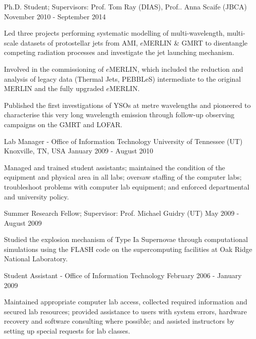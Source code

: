 \begin{cventries}
  \cventry
    {Ph.D. Student; Supervisors: Prof. Tom Ray (DIAS), Prof.. Anna Scaife (JBCA)}
    {}
    {}
    {November 2010 - September 2014}
    {
      \begin{cvitems}
        \item {Led three projects performing systematic modelling of multi-wavelength, multi-scale datasets of protostellar jets from AMI, $e$MERLIN \& GMRT to disentangle competing radiation processes and investigate the jet launching mechanism.}
        \item {Involved in the commissioning of $e$MERLIN, which included the reduction and analysis of legacy data (Thermal Jets, PEBBLeS) intermediate to the original MERLIN and the fully upgraded $e$MERLIN.}
        \item {Published the first investigations of YSOs at metre wavelengths and pioneered to characterise this very long wavelength emission through follow-up observing campaigns on the GMRT and LOFAR.}
      \end{cvitems} 
    }\vspace{-6pt}

\cventry
    {Lab Manager - Office of Information Technology}
    {University of Tennessee (UT)}
    {Knoxville, TN, USA}
    {January 2009 - August 2010}
    {
      \begin{cvitems}
        \item {Managed and trained student assistants; maintained the condition of the equipment and physical area in all labs; oversaw staffing of the computer labs; troubleshoot problems with computer lab equipment; and enforced departmental and university policy.}
      \end{cvitems}
    }\vspace{-15pt}

\cventry
    {Summer Research Fellow; Supervisor: Prof. Michael Guidry (UT)}
    {}
    {}
    {May 2009 - August 2009}
    {
      \begin{cvitems}
        \item {Studied the explosion mechanism of Type Ia Supernovae through computational simulations using the FLASH code on the supercomputing facilities at Oak Ridge National Laboratory.}
      \end{cvitems}
    }\vspace{-15pt}

\cventry
    {Student Assistant - Office of Information Technology}
    {}
    {}
    {February 2006 - January 2009}
    {
      \begin{cvitems}
        \item {Maintained appropriate computer lab access, collected required information and secured lab resources; provided assistance to users with system errors, hardware recovery and software consulting where possible; and assisted instructors by setting up special requests for lab classes.}
      \end{cvitems}
    }\vspace{-15pt}


\end{cventries}
